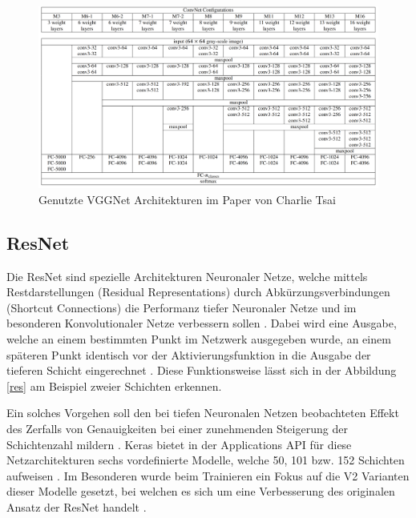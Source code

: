 \documentclass[twoside,a4paper]{IEEEtran}
\begin{document}
\begin{figure}[!htb]
	\centering
	\includegraphics[width=2.1\columnwidth]{conv_net_architectures}
	\caption{Genutzte VGGNet Architekturen im Paper von Charlie Tsai \cite[S.3]{RHC}}
	\label{vggnet}
\end{figure}

\subsection{ResNet} %
Die ResNet sind spezielle Architekturen Neuronaler Netze, welche mittels Restdarstellungen (Residual Representations) durch Abkürzungsverbindungen (Shortcut Connections) die Performanz tiefer Neuronaler Netze und im besonderen Konvolutionaler Netze verbessern sollen \cite[S.1-2]{resnet}. Dabei wird eine Ausgabe, welche an einem bestimmten Punkt im Netzwerk ausgegeben wurde, an einem späteren Punkt identisch vor der Aktivierungsfunktion in die Ausgabe der tieferen Schicht eingerechnet \cite[S.4]{resnet}. Diese Funktionsweise lässt sich in der Abbildung \ref{res} am Beispiel zweier Schichten erkennen.

Ein solches Vorgehen soll den bei tiefen Neuronalen Netzen beobachteten Effekt des Zerfalls von Genauigkeiten bei einer zunehmenden Steigerung der Schichtenzahl mildern \cite[S.1]{resnet}. Keras bietet in der Applications API für diese Netzarchitekturen sechs vordefinierte Modelle, welche 50, 101 bzw. 152 Schichten aufweisen \cite{resnet_keras}. Im Besonderen wurde beim Trainieren ein Fokus auf die V2 Varianten dieser Modelle gesetzt, bei welchen es sich um eine Verbesserung des originalen Ansatz der ResNet handelt \cite{resnetv2}.
\end{document}
